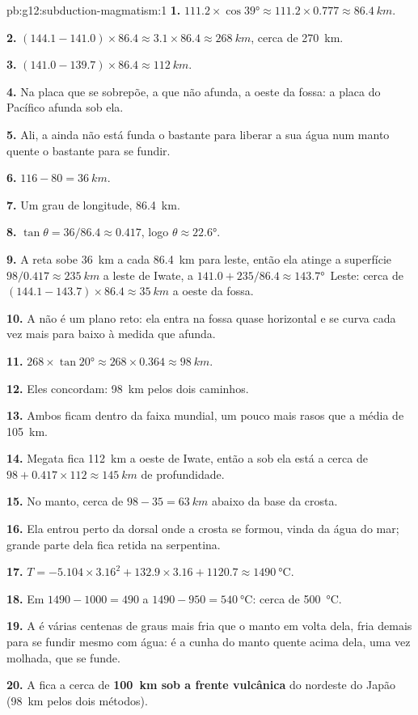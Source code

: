 \begin{solution}{pb:g12:subduction-magmatism:1}
\textbf{1.} $111.2 \times \cos\ang{39} \approx 111.2 \times 0.777 \approx
\qty{86.4}{km}$.

\textbf{2.} $(144.1 - 141.0) \times 86.4 \approx 3.1 \times 86.4 \approx
\qty{268}{km}$, cerca de \qty{270}{km}.

\textbf{3.} $(141.0 - 139.7) \times 86.4 \approx \qty{112}{km}$.

\textbf{4.} Na placa que se sobrepõe, a que não afunda, a oeste da fossa: a
placa do Pacífico afunda sob ela.

\textbf{5.} Ali, a  ainda não está funda o bastante para liberar a sua
água num manto quente o bastante para se fundir.

\textbf{6.} $116 - 80 = \qty{36}{km}$.

\textbf{7.} Um grau de longitude, \qty{86.4}{km}.

\textbf{8.} $\tan\theta = 36/86.4 \approx 0.417$, logo $\theta \approx
\ang{22.6}$.

\textbf{9.} A reta sobe \qty{36}{km} a cada \qty{86.4}{km} para leste, então
ela atinge a superfície $98/0.417 \approx \qty{235}{km}$ a leste de Iwate, a
$141.0 + 235/86.4 \approx \ang{143.7}$~Leste: cerca de $(144.1 - 143.7) \times 86.4
\approx \qty{35}{km}$ a oeste da fossa.

\textbf{10.} A  não é um plano reto: ela entra na fossa quase
horizontal e se curva cada vez mais para baixo à medida que afunda.

\textbf{11.} $268 \times \tan\ang{20} \approx 268 \times 0.364 \approx
\qty{98}{km}$.

\textbf{12.} Eles concordam: \qty{98}{km} pelos dois caminhos.

\textbf{13.} Ambos ficam dentro da faixa mundial, um pouco mais rasos que a
média de \qty{105}{km}.

\textbf{14.} Megata fica \qty{112}{km} a oeste de Iwate, então a  sob
ela está a cerca de $98 + 0.417 \times 112 \approx \qty{145}{km}$ de
profundidade.

\textbf{15.} No manto, cerca de $98 - 35 = \qty{63}{km}$ abaixo da base da
crosta.

\textbf{16.} Ela entrou perto da dorsal onde a crosta se formou, vinda da
água do mar; grande parte dela fica retida na serpentina.

\textbf{17.} $T = -5.104 \times 3.16^2 + 132.9 \times 3.16 + 1120.7 \approx
\qty{1490}{\celsius}$.

\textbf{18.} Em $1490 - 1000 = 490$ a $1490 - 950 = \qty{540}{\celsius}$:
cerca de \qty{500}{\celsius}.

\textbf{19.} A  é várias centenas de graus mais fria que o manto em
volta dela, fria demais para se fundir mesmo com água: é a cunha do manto
quente acima dela, uma vez molhada, que se funde.

\textbf{20.} A  fica a cerca de \textbf{\qty{100}{km} sob a frente
vulcânica} do nordeste do Japão (\qty{98}{km} pelos dois métodos).
\end{solution}
